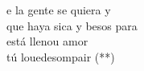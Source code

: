 \begin{cancion}%
	e la gente se quiera y\\
	que haya sica y besos para  \\
	 está llenou amor\\
	tú louedesompair (**)\\
\end{cancion}%
